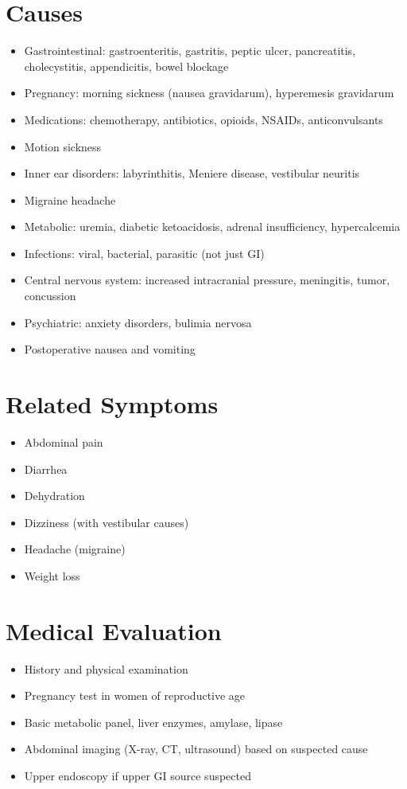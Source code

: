 \section*{Causes}
\begin{itemize}
\item Gastrointestinal: gastroenteritis, gastritis, peptic ulcer, pancreatitis, cholecystitis, appendicitis, bowel blockage
\item Pregnancy: morning sickness (nausea gravidarum), hyperemesis gravidarum
\item Medications: chemotherapy, antibiotics, opioids, NSAIDs, anticonvulsants
\item Motion sickness
\item Inner ear disorders: labyrinthitis, Meniere disease, vestibular neuritis
\item Migraine headache
\item Metabolic: uremia, diabetic ketoacidosis, adrenal insufficiency, hypercalcemia
\item Infections: viral, bacterial, parasitic (not just GI)
\item Central nervous system: increased intracranial pressure, meningitis, tumor, concussion
\item Psychiatric: anxiety disorders, bulimia nervosa
\item Postoperative nausea and vomiting
\end{itemize}

\section*{Related Symptoms}
\begin{itemize}
\item Abdominal pain
\item Diarrhea
\item Dehydration
\item Dizziness (with vestibular causes)
\item Headache (migraine)
\item Weight loss
\end{itemize}

\section*{Medical Evaluation}
\begin{itemize}
\item History and physical examination
\item Pregnancy test in women of reproductive age
\item Basic metabolic panel, liver enzymes, amylase, lipase
\item Abdominal imaging (X-ray, CT, ultrasound) based on suspected cause
\item Upper endoscopy if upper GI source suspected
\end{itemize}

